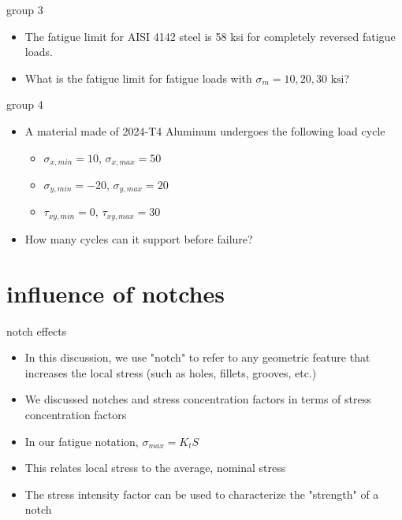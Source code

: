 \documentclass[10pt]{beamer}
\begin{document}
\begin{frame}{group 3}
	\begin{itemize}
		\item The fatigue limit for AISI 4142 steel is 58 ksi for completely reversed fatigue loads.
		\item What is the fatigue limit for fatigue loads with $\sigma_m = 10, 20, 30 \text{ ksi}$?
	\end{itemize}
\end{frame}

\begin{frame}{group 4}
	\begin{itemize}
		\item A material made of 2024-T4 Aluminum undergoes the following load cycle
		\begin{itemize}
			\item $\sigma_{x,min} = 10$, $\sigma_{x,max} = 50$
			\item $\sigma_{y,min} = -20$, $\sigma_{y,max} = 20$
			\item $\tau_{xy,min} = 0$, $\tau_{xy,max} = 30$
		\end{itemize}
		\item How many cycles can it support before failure?
	\end{itemize}
\end{frame}

\section{influence of notches}

\begin{frame}{notch effects}
	\begin{itemize}[<+->]
		\item In this discussion, we use "notch" to refer to any geometric feature that increases the local stress (such as holes, fillets, grooves, etc.)
		\item We discussed notches and stress concentration factors in terms of stress concentration factors
		\item In our fatigue notation, $\sigma_{max} = K_t S$
		\item This relates local stress to the average, nominal stress
		\item The stress intensity factor can be used to characterize the "strength" of a notch
	\end{itemize}
\end{frame}
\end{document}
